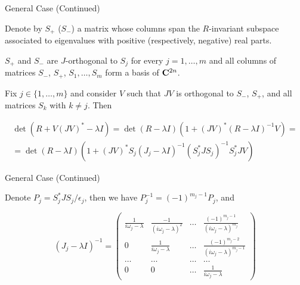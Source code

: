 \begin{frame}{General Case (Continued)}


Denote by $S_{+}$ ($S_{-}$) a matrix whose columns span the $R$-invariant subspace associated to eigenvalues with positive (respectively, negative) real parts. 

\begin{block}{} 
$S_{+}$ and $S_{-}$ are $J$-orthogonal to $S_{j}$ for every $j=1,\ldots,m$ and all columns of matrices $S_{-}$, $S_{+}$, $S_{1},\ldots,S_{m}$ form a basis of ${\bf C}^{2n}$.
\end{block}
\begin{block}{}


Fix $j\in \{1,\ldots,m\}$ and consider $V$ such that $JV$ is orthogonal to $S_{-}$, $S_{+}$, and all matrices $S_{k}$ with $k\ne j$. Then 

$$ \begin{array}{c} \det(R + V(JV)^{*} -\lambda I)=\det(R-\lambda I) (1+(JV)^{*}(R-\lambda I)^{-1}V)= \\
= \det(R-\lambda I) (1+(JV)^{*}S_{j}(J_{j}-\lambda I)^{-1}(S_{j}^{*}JS_{j})^{-1}S_{j}^{*}JV)
\end{array}
$$
\end{block}

\end{frame}

\begin{frame}{General Case (Continued)}


Denote $P_{j}=S_{j}^{*}JS_{j}/\epsilon_{j}$, then
 we have $P_{j}^{-1}=(-1)^{m_{j}-1}P_{j}$, and 
 

\qquad


$$ (J_{j}-\lambda I)^{-1} = 
\left(\begin{array}{cccc}
\frac{1}{i\omega_{j}-\lambda} & \frac{-1}{(i\omega_{j}-\lambda)^{2}} & \ldots & \frac{(-1)^{m_{j}-1}}{(i\omega_{j}-\lambda)^{m_{j}}} \\
0 & \frac{1}{i\omega_{j}-\lambda} & \ldots & \frac{(-1)^{m_{j}-2}}{(i\omega_{j}-\lambda)^{m_{j}-1}} \\
\ldots & \ldots & \ldots & \ldots \\ 0 & 0 & \ldots & 
\frac{1}{i\omega_{j}-\lambda} \end{array}\right)$$




\end{frame}

